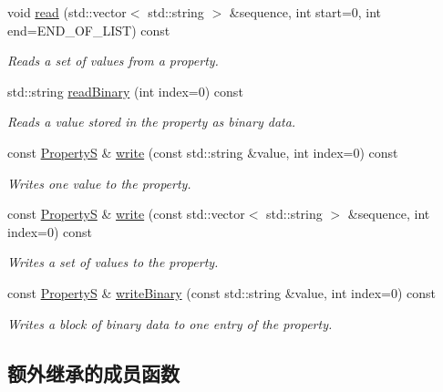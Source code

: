 \begin{DoxyCompactItemize}
void \hyperlink{classmv_i_m_p_a_c_t_1_1acquire_1_1_property_s_ab0f8760103645f666956198cf1a4a6a2}{read} (std\+::vector$<$ std\+::string $>$ \&sequence, int start=0, int end=E\+N\+D\+\_\+\+O\+F\+\_\+\+L\+I\+S\+T) const 
\begin{DoxyCompactList}\small\item\em Reads a set of values from a property. \end{DoxyCompactList}\item 
std\+::string \hyperlink{classmv_i_m_p_a_c_t_1_1acquire_1_1_property_s_a29342383600102e22fd6e235fcd63728}{read\+Binary} (int index=0) const 
\begin{DoxyCompactList}\small\item\em Reads a value stored in the property as binary data. \end{DoxyCompactList}\item 
const \hyperlink{classmv_i_m_p_a_c_t_1_1acquire_1_1_property_s}{Property\+S} \& \hyperlink{classmv_i_m_p_a_c_t_1_1acquire_1_1_property_s_a53972e480094f5a3afe14d1ddb99838b}{write} (const std\+::string \&value, int index=0) const 
\begin{DoxyCompactList}\small\item\em Writes one value to the property. \end{DoxyCompactList}\item 
const \hyperlink{classmv_i_m_p_a_c_t_1_1acquire_1_1_property_s}{Property\+S} \& \hyperlink{classmv_i_m_p_a_c_t_1_1acquire_1_1_property_s_a2ecba49fc3ece8b853403a39b4a235d6}{write} (const std\+::vector$<$ std\+::string $>$ \&sequence, int index=0) const 
\begin{DoxyCompactList}\small\item\em Writes a set of values to the property. \end{DoxyCompactList}\item 
const \hyperlink{classmv_i_m_p_a_c_t_1_1acquire_1_1_property_s}{Property\+S} \& \hyperlink{classmv_i_m_p_a_c_t_1_1acquire_1_1_property_s_ac08293bd5d249b57a66ea5d325c9a37a}{write\+Binary} (const std\+::string \&value, int index=0) const 
\begin{DoxyCompactList}\small\item\em Writes a block of binary data to one entry of the property. \end{DoxyCompactList}\end{DoxyCompactItemize}
\subsection*{额外继承的成员函数}


